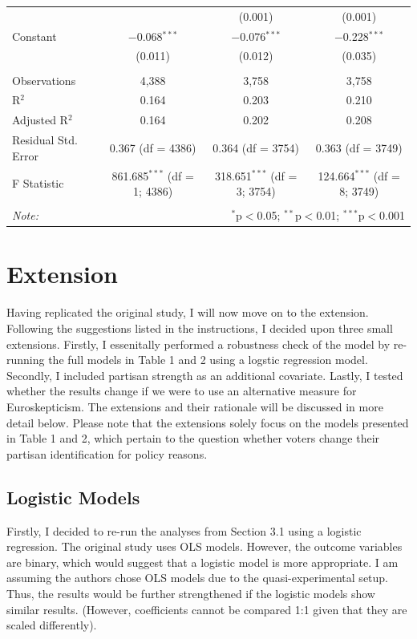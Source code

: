 \documentclass[12pt,letterpaper]{article}
\begin{document}
\begin{table}[H]
{\begin{tabular}{@{\extracolsep{5pt}}lccc}
				&  & (0.001) & (0.001) \\ 
				Constant & $-$0.068$^{***}$ & $-$0.076$^{***}$ & $-$0.228$^{***}$ \\ 
				& (0.011) & (0.012) & (0.035) \\ 
				\hline \\[-1.8ex] 
				Observations & 4,388 & 3,758 & 3,758 \\ 
				R$^{2}$ & 0.164 & 0.203 & 0.210 \\ 
				Adjusted R$^{2}$ & 0.164 & 0.202 & 0.208 \\ 
				Residual Std. Error & 0.367 (df = 4386) & 0.364 (df = 3754) & 0.363 (df = 3749) \\ 
				F Statistic & 861.685$^{***}$ (df = 1; 4386) & 318.651$^{***}$ (df = 3; 3754) & 124.664$^{***}$ (df = 8; 3749) \\ 
				\hline 
				\hline \\[-1.8ex] 
				\textit{Note:}  & \multicolumn{3}{r}{$^{*}$p$<$0.05; $^{**}$p$<$0.01; $^{***}$p$<$0.001} \\ 
			\end{tabular}%
		}
	\end{table}
	
	\section{Extension}
	Having replicated the original study, I will now move on to the extension. Following the suggestions listed in the instructions, I decided upon three small extensions. Firstly, I essenitally performed a robustness check of the model by re-running the full models in Table 1 and 2 using a logstic regression model. Secondly, I included partisan strength as an additional covariate. Lastly, I tested whether the results change if we were to use an alternative measure for Euroskepticism. The extensions and their rationale will be discussed in more detail below. Please note that the extensions solely focus on the models presented in Table 1 and 2, which pertain to the question whether voters change their partisan identification for policy reasons. 
	
	\subsection{Logistic Models}
	Firstly, I decided to re-run the analyses from Section 3.1 using a logistic regression. The original study uses OLS models. However, the outcome variables are binary, which would suggest that a logistic model is more appropriate. I am assuming the authors chose OLS models due to the quasi-experimental setup. Thus, the results would be further strengthened if the logistic models show similar results. (However, coefficients cannot be compared 1:1 given that they are scaled differently).
	
\end{document}
